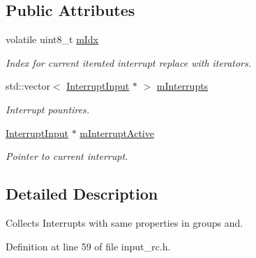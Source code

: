 \subsection*{Public Attributes}
\begin{DoxyCompactItemize}
\item 
volatile uint8\+\_\+t \hyperlink{classSPMB_1_1InterruptGroup_a390d762b5aaa808d07aef963fa5296ed}{m\+Idx}\hypertarget{classSPMB_1_1InterruptGroup_a390d762b5aaa808d07aef963fa5296ed}{}\label{classSPMB_1_1InterruptGroup_a390d762b5aaa808d07aef963fa5296ed}

\begin{DoxyCompactList}\small\item\em Index for current iterated interrupt  replace with iterators. \end{DoxyCompactList}\item 
std\+::vector$<$ \hyperlink{classSPMB_1_1InterruptInput}{Interrupt\+Input} $\ast$ $>$ \hyperlink{classSPMB_1_1InterruptGroup_a0eff897d66e69f20cbc4c83d05a64293}{m\+Interrupts}\hypertarget{classSPMB_1_1InterruptGroup_a0eff897d66e69f20cbc4c83d05a64293}{}\label{classSPMB_1_1InterruptGroup_a0eff897d66e69f20cbc4c83d05a64293}

\begin{DoxyCompactList}\small\item\em Interrupt pountires. \end{DoxyCompactList}\item 
\hyperlink{classSPMB_1_1InterruptInput}{Interrupt\+Input} $\ast$ \hyperlink{classSPMB_1_1InterruptGroup_a894e60cb901974f3b2731c5638245340}{m\+Interrupt\+Active}\hypertarget{classSPMB_1_1InterruptGroup_a894e60cb901974f3b2731c5638245340}{}\label{classSPMB_1_1InterruptGroup_a894e60cb901974f3b2731c5638245340}

\begin{DoxyCompactList}\small\item\em Pointer to current interrupt. \end{DoxyCompactList}\end{DoxyCompactItemize}


\subsection{Detailed Description}
Collects Interrupts with same properties in groups and. 

Definition at line 59 of file input\+\_\+rc.\+h.

